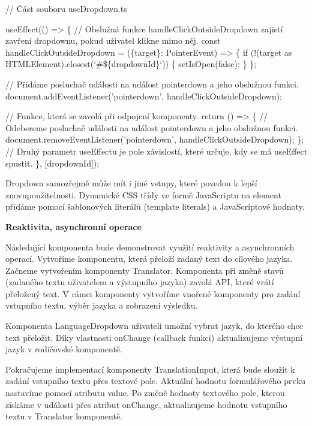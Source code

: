 \begin{prog}
// Část souboru useDropdown.ts

useEffect(() => \{
  // Obslužná funkce handleClickOutsideDropdown zajistí zavření dropdownu,
    pokud uživatel klikne mimo něj.
  const handleClickOutsideDropdown = (\{target\}: PointerEvent) => \{
    if (!(target as HTMLElement).closest(`#\$\{dropdownId\}`)) \{
      setIsOpen(false);
    \}
  \};

  // Přidáme posluchač události na událost pointerdown a jeho obslužnou funkci.
  document.addEventListener('pointerdown', handleClickOutsideDropdown);

  // Funkce, která se zavolá při odpojení komponenty.
  return () => \{
    // Odebereme posluchač události na událost
      pointerdown a jeho obslužnou funkci.
    document.removeEventListener('pointerdown', handleClickOutsideDropdown);
  \};
  // Druhý parametr useEffectu je pole závislostí, 
    které určuje, kdy se má useEffect spustit.
\}, [dropdownId]);
\end{prog}

Dropdown samozřejmě může mít i jiné vstupy, které povedou k lepší znovupoužitelnosti. 
Dynamické CSS třídy ve formě JavaScriptu na element přidáme pomocí šablonových literálů (template literals) a JavaScriptové hodnoty.

\begin{flushleft}
  \textbf{Reaktivita, asynchronní operace}
\end{flushleft}

Následující komponenta bude demonstrovat využití reaktivity a asynchronních operací. Vytvoříme komponentu, která přeloží zadaný text do cílového jazyka. 
Začneme vytvořením komponenty Translator. Komponenta při změně stavů (zadaného textu uživatelem a výstupního jazyka) zavolá API, které vrátí přeložený text.
V rámci komponenty vytvoříme vnořené komponenty pro zadání vstupního textu, výběr jazyka a zobrazení výsledku.

Komponenta LanguageDropdown uživateli umožní vybrat jazyk, do kterého chce text přeložit. 
Díky vlastnosti onChange (callback funkci) aktualizujeme výstupní jazyk v rodičovské komponentě. 

Pokračujeme implementací komponenty TranslationInput, která bude sloužit k zadání vstupního textu přes textové pole. Aktuální hodnotu formulářového prvku nastavíme pomocí atributu value.
Po změně hodnoty textového pole, kterou získáme v události přes atribut onChange, aktualizujeme hodnotu vstupního textu v Translator komponentě.

